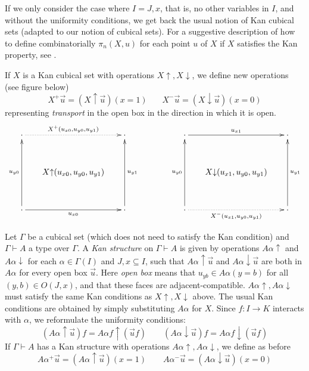 \documentclass[a4paper,USenglish,draft]{lipics}
\newcommand{\rup}[1]{#1{\uparrow}}
\newcommand{\rdo}[1]{#1{\downarrow}}
\begin{document}
If we only consider the case where $I = J,x$, that is, no other
variables in $I$, and without the uniformity conditions, we get back
the usual notion of Kan cubical sets \cite[Section 4]{Kan} (adapted to
our notion of cubical sets).  For a suggestive description of how to
define combinatorially $\pi_n(X,u)$ for each point $u$ of $X$ if $X$
satisfies the Kan property, see \cite{Williamson}.


If $X$ is a Kan cubical set with operations $\rup{X},\rdo{X}$, we
define new operations (see figure below)
$$
X^+\vec u = (\rup{X} \vec u)(x=1)~~~~~~~~X^-\vec u = (\rdo{X} \vec
u)(x=0)$$ representing \emph{transport} in the open box in the
direction in which it is open.
\def\noe{\cdot}
\[
\xymatrix@R=1.1cm@C=.6cm{
\noe\ar@{.>}[rr]^{X^+(u_{x0}, u_{y0},u_{y1})}&      & \noe                                     &&&
\noe\ar[rr]^{u_{x1}}                                 &      & \noe      \\
                                      &\rup{X}(u_{x0}, u_{y0},u_{y1})&                          &&&
                                      &\rdo{X}(u_{x1}, u_{y0},u_{y1})&                              \\
\noe\ar[rr]_{u_{x0}}\ar[uu]^{u_{y0}}&      & \noe\ar[uu]_{u_{y1}}                                     &&&
\noe\ar@{.>}[rr]_{X^-(u_{x1}, u_{y0},u_{y1})}\ar[uu]^{u_{y0}}     &      & \noe\ar[uu]_{u_{y1}}                       \\
}
\]


Let $\Gamma$ be a cubical set (which does not need to satisfy the Kan
condition) and $\Gamma\vdash A$ a type over $\Gamma$.  A \emph{Kan
  structure} on $\Gamma \vdash A$ is given by operations $\rup{A
  \alpha}$ and $\rdo{A \alpha}$ for each $\alpha\in\Gamma(I)$ and
$J,x\subseteq I$, such that $\rup{A\alpha} \vec u$ and $\rdo{A\alpha}
\vec u$ are both in $A\alpha$ for every open box $\vec u$.  Here
\emph{open box} means that $u_{yb}\in A\alpha(y=b)$ for all $(y,b)\in
O(J,x)$, and that these faces are adjacent-compatible.
$\rup{A\alpha}, \rdo{A\alpha}$ must satisfy the same Kan conditions as
$ \rup{X},\rdo{X}$ above.  The usual Kan conditions are obtained by
simply substituting $A\alpha$ for $X$.  Since $f:I\to K$ interacts
with $\alpha$, we reformulate the uniformity conditions:
\[
(\rup{A\alpha} \vec u)f = \rup{A\alpha f} (\vec{u}f) \qquad
(\rdo{A\alpha} \vec u)f = \rdo{A\alpha f} (\vec{u}f)
\]
If $\Gamma\vdash A$ has a Kan structure with operations
$\rup{A\alpha},\rdo{A\alpha}$, we define as before
\[
A\alpha^+\vec u = (\rup{A\alpha} \vec u)(x=1) \qquad
A\alpha^-\vec u = (\rdo{A\alpha} \vec u)(x=0)
\]
\end{document}
